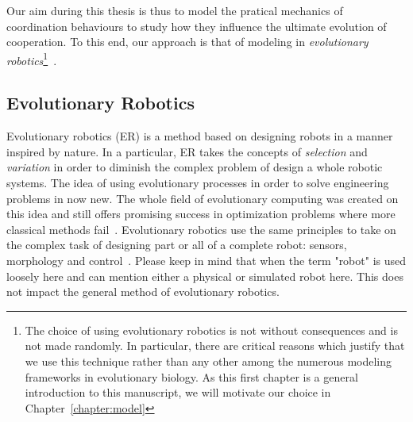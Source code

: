     Our aim during this thesis is thus to model the pratical mechanics of coordination behaviours to study how they influence the ultimate evolution of cooperation. To this end, our approach is that of modeling in \emph{evolutionary robotics}\footnote{The choice of using evolutionary robotics is not without consequences and is not made randomly. In particular, there are critical reasons which justify that we use this technique rather than any other among the numerous modeling frameworks in evolutionary biology. As this first chapter is a general introduction to this manuscript, we will motivate our choice in Chapter~\ref{chapter:model}}~\parencite{Nolfi2000}.


  \subsection{Evolutionary Robotics}

    Evolutionary robotics (ER) is a method based on designing robots in a manner inspired by nature. In a particular, ER takes the concepts of \emph{selection} and \emph{variation} in order to diminish the complex problem of design a whole robotic systems. The idea of using evolutionary processes in order to solve engineering problems in now new. The whole field of evolutionary computing was created on this idea and still offers promising success in optimization problems where more classical methods fail~\parencite{Holland1975, Goldberg1989, Eiben2003}. Evolutionary robotics use the same principles to take on the complex task of designing part or all of a complete robot: sensors, morphology and control~\parencite{Nolfi2000, Floreano2008, Doncieux2015a}. Please keep in mind that when the term "robot" is used loosely here and can mention either a physical or simulated robot here. This does not impact the general method of evolutionary robotics.


